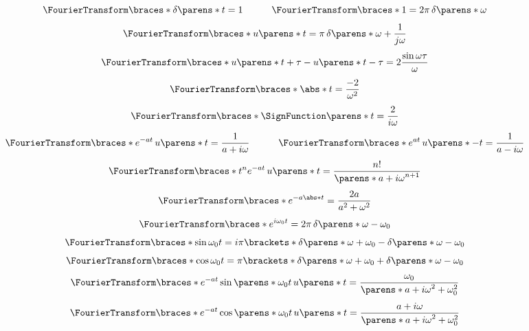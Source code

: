 \begin{multicols}{2}
\begin{CheatsheetEntryFrame}
        \begin{gather*}
            \FourierTransform\braces*{\delta\parens*{t}}
            = 1
            \qquad\quad
            \FourierTransform\braces*{1}
            = 2 \pi \, \delta\parens*{\omega}
            \\[0.4em]
            \FourierTransform\braces*{u\parens*{t}}
            = \pi \, \delta\parens*{\omega} + \frac{1}{j \omega}
            \\[0.4em]
            \FourierTransform\braces*{u\parens*{t + \tau} - u\parens*{t - \tau}}
            = 2 \frac{\sin{\omega \tau}}{\omega}
            \\[0.4em]
            \FourierTransform\braces*{\abs*{t}}
            = \frac{- 2}{\omega^2}
            \\[0.4em]
            \FourierTransform\braces*{\SignFunction\parens*{t}}
            = \frac{2}{i \omega}
            \\[0.4em]
            \FourierTransform\braces*{e^{-a t} \, u\parens*{t}}
            = \frac{1}{a + i \omega}
            \qquad\quad
            \FourierTransform\braces*{e^{a t} \, u\parens*{-t}}
            = \frac{1}{a - i \omega}
            \\[0.4em]
            \FourierTransform\braces*{t^n e^{-a t} \, u\parens*{t}}
            = \frac{n!}{\parens*{a + i \omega}^{n + 1}}
            \\[0.4em]
            \FourierTransform\braces*{e^{-a \abs*{t}}}
            = \frac{2 a}{a^2 + \omega^2}
            \\[0.4em]
            \FourierTransform\braces*{e^{i \omega_0 t}}
            = 2 \pi \, \delta\parens*{\omega - \omega_0}
            \\[0.4em]
            \FourierTransform\braces*{\sin{\omega_0 t}}
            = i \pi \brackets*{
                \delta\parens*{\omega + \omega_0} - \delta\parens*{\omega - \omega_0}
            }
            \\[0.4em]
            \FourierTransform\braces*{\cos{\omega_0 t}}
            = \pi \brackets*{
                \delta\parens*{\omega + \omega_0} + \delta\parens*{\omega - \omega_0}
            }
            \\[0.4em]
            \FourierTransform\braces*{e^{-a t} \sin\parens*{\omega_0 t} \, u\parens*{t}}
            = \frac{\omega_0}{\parens*{a + i \omega}^2 + \omega_0^2}
            \\[0.4em]
            \FourierTransform\braces*{e^{-a t} \cos\parens*{\omega_0 t} \, u\parens*{t}}
            = \frac{a + i \omega}{\parens*{a + i \omega}^2 + \omega_0^2}
        \end{gather*}

    \end{CheatsheetEntryFrame}
    
\end{multicols}
